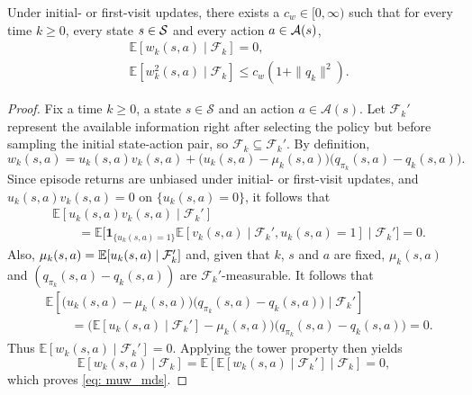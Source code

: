 \begin{lemma}
\label{thm: properties of noise}

Under initial- or first-visit updates, 
there exists a $c_w \in [0,\infty)$
such that for every time $k \ge 0$, every state $s \in \mathcal{S}$ and every action $a \in \mathcal{A}(s)$,
\vspace{-0.3cm}
\begin{align}
\label{eq: muw_mds}
&\mathbb E [w_k(s,a) \mid \mathcal F_k ] = 0,
\\
\label{eq: muw_second_moment}
&\mathbb E [w_k^2(s,a) \mid \mathcal F_k ] \le c_w(1+\|q_k\|^2) .
\end{align}
\end{lemma}
\vspace{-0.9cm}
\begin{proof}
    Fix a time $k\ge 0$, a state $s \in \mathcal S$ and an action $a \in \mathcal A(s)$.
    Let $\mathcal F_k'$ represent the available information right after selecting the policy but before sampling the initial state-action pair, so $\mathcal F_k \subseteq \mathcal F_k'$.
    By definition,
    \[
    w_k(s,a) = u_k(s,a) v_k(s,a) + \big( u_k(s,a)-\mu_k(s,a) \big) \big( q_{\pi_k}(s,a) - q_k(s,a) \big).
    \]
    Since episode returns are unbiased under initial- or first-visit updates,
    and $u_k(s,a) v_k(s,a) = 0$ on $\{u_k(s,a)=0\}$,
    it follows that
    \begin{align*}
    &\mathbb E[ u_k(s,a) v_k(s,a) \mid \mathcal F_k']
    \\
    &\qquad=
    \mathbb E \big[ 
        \mathbf 1_{\{u_k(s,a)=1\}} \mathbb E[ v_{k}(s,a) \mid \mathcal F_k', u_k(s,a)=1] 
        \mid \mathcal F_k' \big]
    = 0 .
    \end{align*}
    Also, $\mu_k(s,a) = \operatorname*{\mathbb{E}}[u_k(s,a) \mid \mathcal F_k']$ and,
    given that $k$, $s$ and $a$ are fixed,
    $\mu_k(s,a)$ and $(q_{\pi_k}(s,a)-q_k(s,a))$ are $\mathcal F_k'$-measurable. It follows that
    \begin{align*}
    &\mathbb E \!\left[
    \big( u_k(s,a)-\mu_k(s,a) \big) \big( q_{\pi_k}(s,a)-q_k(s,a) \big)
    \mid \mathcal F_k'
    \right]
    \\
    &\qquad =
    \big( \mathbb E [
     u_k(s,a)
    \mid \mathcal F_k'
    ]
    - \mu_k(s,a) 
     \big) 
    \big( q_{\pi_k}(s,a)-q_k(s,a) \big) 
    =
    0 .
    \end{align*}
    Thus $\mathbb E[w_k(s,a) \mid \mathcal F_k'] = 0$.
    Applying the tower property then yields
    \[
    \mathbb E [ w_{k}(s,a) \mid \mathcal F_k ]
    = \mathbb E \!\left[ \mathbb E [ w_{k}(s,a) \mid \mathcal F_k'] \mid \mathcal F_k \right]
    = 0 ,
    \]
    which proves \eqref{eq: muw_mds}.
    

\end{proof}
